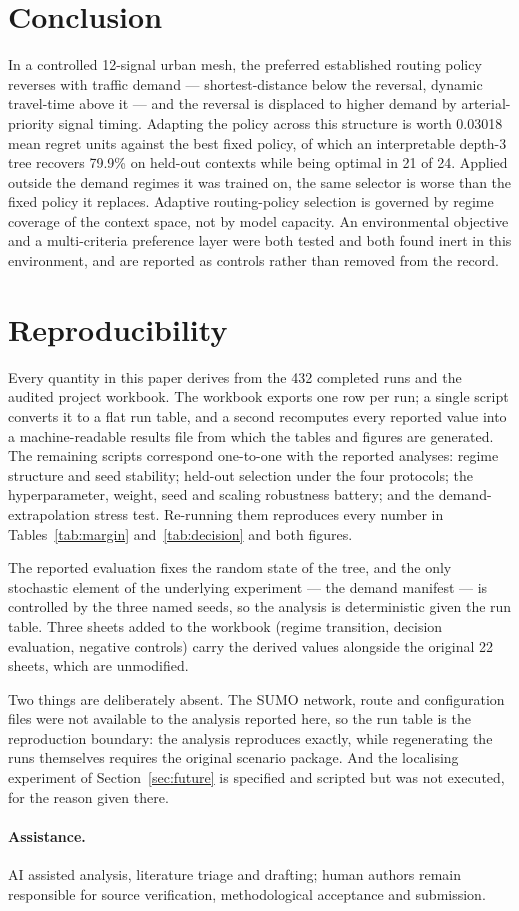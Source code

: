 \documentclass[10pt,a4paper]{article}
\begin{document}
\section{Conclusion}
In a controlled 12-signal urban mesh, the preferred established routing policy reverses with traffic demand --- shortest-distance below the reversal, dynamic travel-time above it --- and the reversal is displaced to higher demand by arterial-priority signal timing. Adapting the policy across this structure is worth 0.03018 mean regret units against the best fixed policy, of which an interpretable depth-3 tree recovers 79.9\% on held-out contexts while being optimal in 21 of 24. Applied outside the demand regimes it was trained on, the same selector is worse than the fixed policy it replaces. Adaptive routing-policy selection is governed by regime coverage of the context space, not by model capacity. An environmental objective and a multi-criteria preference layer were both tested and both found inert in this environment, and are reported as controls rather than removed from the record.

\section{Reproducibility}
Every quantity in this paper derives from the 432 completed runs and the audited project workbook. The workbook exports one row per run; a single script converts it to a flat run table, and a second recomputes every reported value into a machine-readable results file from which the tables and figures are generated. The remaining scripts correspond one-to-one with the reported analyses: regime structure and seed stability; held-out selection under the four protocols; the hyperparameter, weight, seed and scaling robustness battery; and the demand-extrapolation stress test. Re-running them reproduces every number in Tables~\ref{tab:margin} and~\ref{tab:decision} and both figures.

The reported evaluation fixes the random state of the tree, and the only stochastic element of the underlying experiment --- the demand manifest --- is controlled by the three named seeds, so the analysis is deterministic given the run table. Three sheets added to the workbook (regime transition, decision evaluation, negative controls) carry the derived values alongside the original 22 sheets, which are unmodified.

Two things are deliberately absent. The SUMO network, route and configuration files were not available to the analysis reported here, so the run table is the reproduction boundary: the analysis reproduces exactly, while regenerating the runs themselves requires the original scenario package. And the localising experiment of Section~\ref{sec:future} is specified and scripted but was not executed, for the reason given there.

\paragraph{Assistance.} AI assisted analysis, literature triage and drafting; human authors remain responsible for source verification, methodological acceptance and submission.



\end{document}
